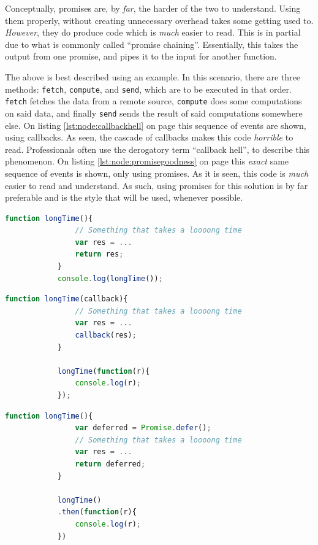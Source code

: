 		Conceptually, promises are, by \emph{far}, the harder of the two to understand. Using them properly, without creating unnecessary overhead takes some getting used to. \emph{However}, they do produce code which is \emph{much} easier to read. This is in partial due to what is commonly called ``promise chaining''. Essentially, this takes the output from one promise, and pipes it to the input for another function. 

		The above is best described using an example. In this scenario, there are three methods: \verb=fetch=, \verb=compute=, and \verb=send=, which are to be executed in that order. \verb=fetch= fetches the data from a remote source, \verb=compute= does some computations on said data, and finally \verb=send= sends the result of said computations somewhere else. On listing \ref{lst:node:callbackhell} on page \pageref{lst:node:callbackhell} this sequence of events are shown, using callbacks. As seen, the cascade of callbacks makes this code \emph{horrible} to read. Professionals often use the derogatory term ``callback hell'', to describe this phenomenon. On listing \ref{lst:node:promisegoodness} on page \pageref{lst:node:promisegoodness} this \emph{exact} same sequence of events is shown, only using promises. As it is seen, this code is \emph{much} easier to read and understand. As such, using promises for this solution is by far preferable and is the style that will be used, whenever possible.

		\begin{lstlisting}[language=Javascript,gobble=12,caption={The wrong way to do it in Node.js},label={lst:node:wrong}]
            function longTime(){
                // Something that takes a loooong time
                var res = ...
                return res;
            }
            console.log(longTime());
		\end{lstlisting}
		
		\begin{lstlisting}[language=Javascript,gobble=12,caption={Using callbacks in Node.js},label={lst:node:callback}]
            function longTime(callback){
                // Something that takes a loooong time
                var res = ...
                callback(res);
            }
            
            longTime(function(r){
                console.log(r);
            });
		\end{lstlisting}

		\begin{lstlisting}[language=Javascript,gobble=12,caption={Using promises in Node.js},label={lst:node:promise}]
            function longTime(){
                var deferred = Promise.defer();
                // Something that takes a loooong time
                var res = ...
                return deferred;
            }
            
            longTime()
            .then(function(r){
                console.log(r);
            })
		\end{lstlisting}

